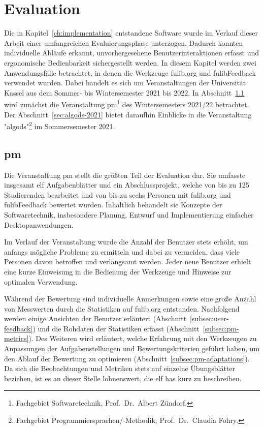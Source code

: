 \chapter{Evaluation}\label{ch:evaluation}

Die in Kapitel~\ref{ch:implementation} entstandene Software wurde im Verlauf dieser Arbeit einer umfangreichen Evaluierungsphase unterzogen.
Dadurch konnten individuelle Abläufe erkannt, unvorhergesehene Benutzerinteraktionen erfasst und ergonomische Bedienbarkeit sichergestellt werden.
In diesem Kapitel werden zwei Anwendungsfälle betrachtet, in denen die Werkzeuge fulib.org und fulibFeedback verwendet wurden.
Dabei handelt es sich um Veranstaltungen der Universität Kassel aus dem Sommer- bis Wintersemester 2021 bis 2022.
In Abschnitt~\ref{sec:pm-2021-2022} wird zunächst die Veranstaltung \ac{pm}\footnote{
    Fachgebiet Softwaretechnik, Prof.\ Dr.\ Albert Zündorf.
} des Wintersemesters 2021/22 betrachtet.
Der Abschnitt~\ref{sec:algods-2021} bietet daraufhin Einblicke in die Veranstaltung "\acl{algods}"\footnote{
    Fachgebiet Programmiersprachen/-Methodik, Prof.\ Dr.\ Claudia Fohry.\label{fn:fg-plm}
} im Sommersemester 2021.

\section{\acl{pm}}\label{sec:pm-2021-2022}

Die Veranstaltung \ac{pm} stellt die größten Teil der Evaluation dar.
Sie umfasste insgesamt elf Aufgabenblätter und ein Abschlussprojekt, welche von bis zu 125 Studierenden bearbeitet und von bis zu sechs Personen mit fulib.org und fulibFeedback bewertet wurden.
Inhaltlich behandelt sie Konzepte der Softwaretechnik, insbesondere Planung, Entwurf und Implementierung einfacher Desktopanwendungen.

Im Verlauf der Veranstaltung wurde die Anzahl der Benutzer stets erhöht, um anfangs mögliche Probleme zu ermitteln und dabei zu vermeiden, dass viele Personen davon betroffen und verlangsamt werden.
Jeder neue Benutzer erhielt eine kurze Einweisung in die Bedienung der Werkzeuge und Hinweise zur optimalen Verwendung.

Während der Bewertung sind individuelle Anmerkungen sowie eine große Anzahl von Messwerten durch die Statistiken auf fulib.org entstanden.
Nachfolgend werden einige Ansichten der Benutzer erläutert (Abschnitt~\ref{subsec:user-feedback}) und die Rohdaten der Statistiken erfasst (Abschnitt~\ref{subsec:pm-metrics}).
Des Weiteren wird erläutert, welche Erfahrung mit den Werkzeugen zu Anpassungen der Aufgabenstellungen und Bewertungskriterien geführt haben, um den Ablauf der Bewertung zu optimieren (Abschnitt~\ref{subsec:pm-adaptations}).
Da sich die Beobachtungen und Metriken stets auf einzelne Übungsblätter beziehen, ist es an dieser Stelle lohnenswert, die elf \acp{ha} kurz zu beschreiben.

